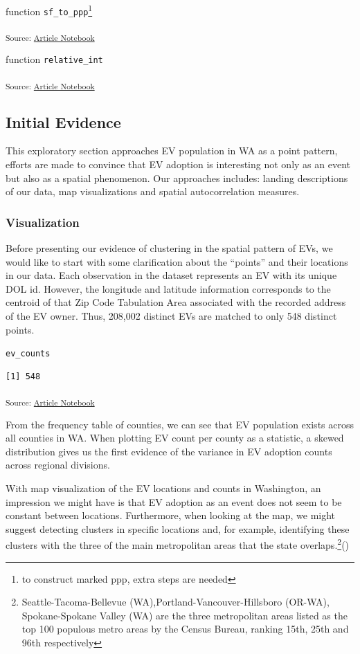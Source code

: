 \documentclass[
  letterpaper,
  DIV=11,
  numbers=noendperiod]{scrartcl}
\begin{document}
function \texttt{sf\_to\_ppp}\footnote{to construct marked ppp, extra
  steps are needed}

\textsubscript{Source:
\href{https://h-christy.github.io/24-manuscript/index.qmd.html}{Article
Notebook}}

function \texttt{relative\_int}

\textsubscript{Source:
\href{https://h-christy.github.io/24-manuscript/index.qmd.html}{Article
Notebook}}

\subsection{Initial Evidence}\label{initial-evidence}

This exploratory section approaches EV population in WA as a point
pattern, efforts are made to convince that EV adoption is interesting
not only as an event but also as a spatial phenomenon. Our approaches
includes: landing descriptions of our data, map visualizations and
spatial autocorrelation measures.

\subsubsection{Visualization}\label{visualization}

Before presenting our evidence of clustering in the spatial pattern of
EVs, we would like to start with some clarification about the ``points''
and their locations in our data. Each observation in the dataset
represents an EV with its unique DOL id. However, the longitude and
latitude information corresponds to the centroid of that Zip Code
Tabulation Area associated with the recorded address of the EV owner.
Thus, 208,002 distinct EVs are matched to only 548 distinct points.

\texttt{ev\_counts}

\begin{verbatim}
[1] 548
\end{verbatim}

\textsubscript{Source:
\href{https://h-christy.github.io/24-manuscript/index.qmd.html}{Article
Notebook}}

From the frequency table of counties, we can see that EV population
exists across all counties in WA. When plotting EV count per county as a
statistic, a skewed distribution gives us the first evidence of the
variance in EV adoption counts across regional divisions.

With map visualization of the EV locations and counts in Washington, an
impression we might have is that EV adoption as an event does not seem
to be constant between locations. Furthermore, when looking at the map,
we might suggest detecting clusters in specific locations and, for
example, identifying these clusters with the three of the main
metropolitan areas that the state
overlaps.\footnote{Seattle-Tacoma-Bellevue
  (WA),Portland-Vancouver-Hillsboro (OR-WA), Spokane-Spokane Valley (WA)
  are the three metropolitan areas listed as the top 100 populous metro
  areas by the Census Bureau, ranking 15th, 25th and 96th respectively}()
\end{document}
